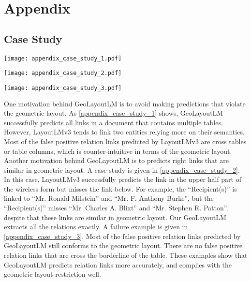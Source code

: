 \documentclass[10pt,twocolumn,letterpaper]{article}
\begin{document}
{\small


}


\newpage
\appendix
\section{Appendix}

\subsection{Case Study}
\label{sec:case_study}

\begin{figure*}[tp]
  \centering
  \texttt{[image: appendix\_case\_study\_1.pdf]}
  \caption{RE case study in tables.}
  \label{appendix_case_study_1}
\end{figure*}


\begin{figure*}[tp]
  \centering
  \texttt{[image: appendix\_case\_study\_2.pdf]}
  \caption{RE case study in a borderless table.}
  \label{appendix_case_study_2}
\end{figure*}

\begin{figure*}[tp]
  \centering
  \texttt{[image: appendix\_case\_study\_3.pdf]}
  \caption{Failure cases comparison.}
  \label{appendix_case_study_3}
\end{figure*}


One motivation behind GeoLayoutLM is to avoid making predictions that violate the geometric layout.
As \cref{appendix_case_study_1} shows, GeoLayoutLM successfully predicts all links in a document that contains multiple tables. 
However, LayoutLMv3 tends to link two entities relying more on their semantics.
Most of the false positive relation links predicted by LayoutLMv3 are cross tables or table columns, which is counter-intuitive in terms of the geometric layout.
Another motivation behind GeoLayoutLM is to predicts right links that are similar in geometric layout.
A case study is given in \cref{appendix_case_study_2}.
In this case, LayoutLMv3 successfully predicts the link in the upper half part of the wireless form but misses the link below. For example, the ``Recipient(s)'' is linked to ``Mr. Ronald Milstein'' and ``Mr. F. Anthony Burke'', but the ``Recipient(s)'' misses ``Mr. Charles A. Blixt'' and ``Mr. Stephen R. Patton'', despite that these links are similar in geometric layout.
Our GeoLayoutLM extracts all the relations exactly.
A failure example is given in \cref{appendix_case_study_3}. 
Most of the false positive relation links predicted by GeoLayoutLM still conforms to the geometric layout. There are no false positive relation links that are cross the borderline of the table.
These examples show that GeoLayoutLM predicts relation links more accurately, and complies with the geometric layout restriction well.
\end{document}
